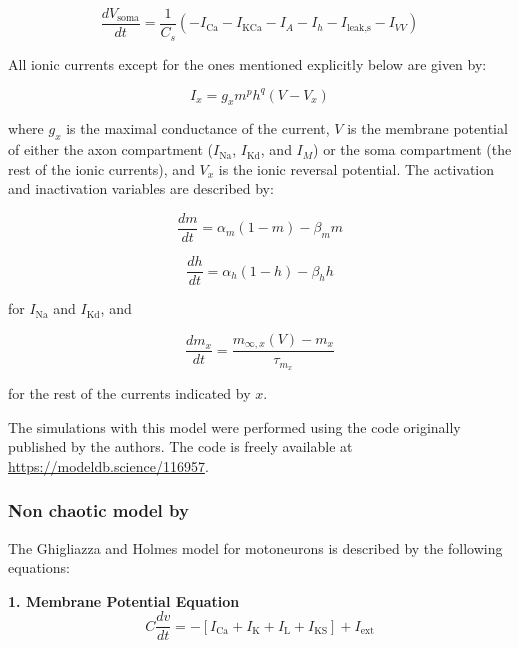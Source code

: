 \begin{equation}
	\frac{dV_{\text{soma}}}{dt} = \frac{1}{C_s} \left( -I_{\text{Ca}} - I_{\text{KCa}} - I_A - I_h - I_{\text{leak,s}} - I_{VV} \right)
\end{equation}

All ionic currents except for the ones mentioned explicitly below are given by:

\begin{equation}
	I_x = g_x m^p h^q (V - V_x)
\end{equation}

where $g_x$ is the maximal conductance of the current, $V$ is the membrane potential of either the axon compartment ($I_{\text{Na}}$, $I_{\text{Kd}}$, and $I_M$) or the soma compartment (the rest of the ionic currents), and $V_x$ is the ionic reversal potential. The activation and inactivation variables are described by:

\begin{equation}
	\frac{dm}{dt} = \alpha_m (1 - m) - \beta_m m
\end{equation}

\begin{equation}
	\frac{dh}{dt} = \alpha_h (1 - h) - \beta_h h
\end{equation}

for $I_{\text{Na}}$ and $I_{\text{Kd}}$, and

\begin{equation}
	\frac{dm_x}{dt} = \frac{m_{\infty,x}(V) - m_x}{\tau_{m_x}}
\end{equation}

for the rest of the currents indicated by $x$.

The simulations with this model were performed using the code originally published by the authors. The code is freely available at \href{https://modeldb.science/116957}{https://modeldb.science/116957}.

\subsubsection{Non chaotic model by \textcite{ghigliazza_minimal_2004b}}
The Ghigliazza and Holmes model \parencite{ghigliazza_minimal_2004b} for motoneurons is described by the following equations:

\textbf{1. Membrane Potential Equation}
\begin{equation}
C \frac{dv}{dt} = -[I_{\text{Ca}} + I_{\text{K}} + I_{\text{L}} + I_{\text{KS}}] + I_{\text{ext}}
\end{equation}

